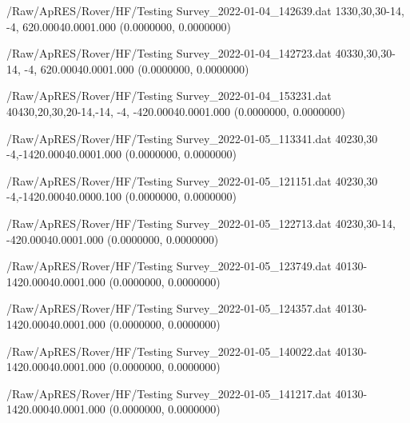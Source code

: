 \hfaprestable
{/Raw/ApRES/Rover/HF/Testing}%
{Survey\_2022-01-04\_142639.dat}%
{1}{3}{30,30,30}{-14, -4,  6}{20.000}{40.000}{1.000}%
{ (0.0000000, 0.0000000)}%
{}%
{}%

\hfaprestable
{/Raw/ApRES/Rover/HF/Testing}%
{Survey\_2022-01-04\_142723.dat}%
{40}{3}{30,30,30}{-14, -4,  6}{20.000}{40.000}{1.000}%
{ (0.0000000, 0.0000000)}%
{}%
{}%

\hfaprestable
{/Raw/ApRES/Rover/HF/Testing}%
{Survey\_2022-01-04\_153231.dat}%
{40}{4}{30,20,30,20}{-14,-14, -4, -4}{20.000}{40.000}{1.000}%
{ (0.0000000, 0.0000000)}%
{}%
{}%

\hfaprestable
{/Raw/ApRES/Rover/HF/Testing}%
{Survey\_2022-01-05\_113341.dat}%
{40}{2}{30,30}{ -4,-14}{20.000}{40.000}{1.000}%
{ (0.0000000, 0.0000000)}%
{}%
{}%

\hfaprestable
{/Raw/ApRES/Rover/HF/Testing}%
{Survey\_2022-01-05\_121151.dat}%
{40}{2}{30,30}{ -4,-14}{20.000}{40.000}{0.100}%
{ (0.0000000, 0.0000000)}%
{}%
{}%

\hfaprestable
{/Raw/ApRES/Rover/HF/Testing}%
{Survey\_2022-01-05\_122713.dat}%
{40}{2}{30,30}{-14, -4}{20.000}{40.000}{1.000}%
{ (0.0000000, 0.0000000)}%
{}%
{}%

\hfaprestable
{/Raw/ApRES/Rover/HF/Testing}%
{Survey\_2022-01-05\_123749.dat}%
{40}{1}{30}{-14}{20.000}{40.000}{1.000}%
{ (0.0000000, 0.0000000)}%
{}%
{}%

\hfaprestable
{/Raw/ApRES/Rover/HF/Testing}%
{Survey\_2022-01-05\_124357.dat}%
{40}{1}{30}{-14}{20.000}{40.000}{1.000}%
{ (0.0000000, 0.0000000)}%
{}%
{}%

\hfaprestable
{/Raw/ApRES/Rover/HF/Testing}%
{Survey\_2022-01-05\_140022.dat}%
{40}{1}{30}{-14}{20.000}{40.000}{1.000}%
{ (0.0000000, 0.0000000)}%
{}%
{}%

\hfaprestable
{/Raw/ApRES/Rover/HF/Testing}%
{Survey\_2022-01-05\_141217.dat}%
{40}{1}{30}{-14}{20.000}{40.000}{1.000}%
{ (0.0000000, 0.0000000)}%
{}%
{}%

